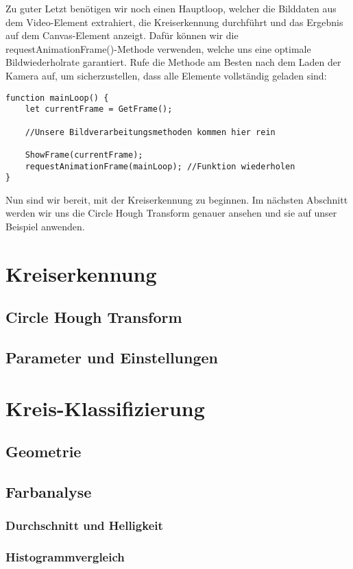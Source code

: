 \documentclass{article}
\begin{document}
Zu guter Letzt benötigen wir noch einen Hauptloop, welcher die Bilddaten aus dem Video-Element extrahiert, die Kreiserkennung durchführt und das Ergebnis auf dem Canvas-Element anzeigt. Dafür können wir die requestAnimationFrame()-Methode verwenden, welche uns eine optimale Bildwiederholrate garantiert. Rufe die Methode am Besten nach dem Laden der Kamera auf, um sicherzustellen, dass alle Elemente vollständig geladen sind:

\begin{lstlisting}[style=JavaScript]
function mainLoop() {
    let currentFrame = GetFrame();
    
    //Unsere Bildverarbeitungsmethoden kommen hier rein

    ShowFrame(currentFrame);
    requestAnimationFrame(mainLoop); //Funktion wiederholen
}
\end{lstlisting}

Nun sind wir bereit, mit der Kreiserkennung zu beginnen. Im nächsten Abschnitt werden wir uns die Circle Hough Transform genauer ansehen und sie auf unser Beispiel anwenden.

\section{Kreiserkennung}
\subsection{Circle Hough Transform}
\subsection{Parameter und Einstellungen}

\section{Kreis-Klassifizierung}
\subsection{Geometrie}
\subsection{Farbanalyse}
\subsubsection{Durchschnitt und Helligkeit}
\subsubsection{Histogrammvergleich}
\end{document}
